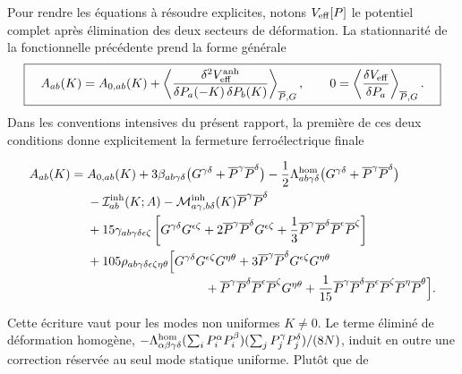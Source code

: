 Pour rendre les équations à résoudre explicites, notons
$V_{\rm eff}[P]$ le potentiel complet après élimination des deux secteurs de
déformation. La stationnarité de la fonctionnelle précédente prend la forme
générale
\begin{equation}
\boxed{\quad A_{ab}(K)=A_{0,ab}(K)
+\left\langle
\frac{\delta^2V_{\rm eff}^{\rm anh}}
{\delta P_a(-K)\,\delta P_b(K)}
\right\rangle_{\overline P,G},
\qquad
0=\left\langle
\frac{\delta V_{\rm eff}}{\delta P_a}
\right\rangle_{\overline P,G}.\quad}
\label{eq:core_ferro_general_scha_equations}
\end{equation}
Dans les conventions intensives du présent rapport, la première de ces deux
conditions donne explicitement la fermeture ferroélectrique finale
\begin{mdframed}[linecolor=red!60!black,nobreak=true]
\small
\begin{equation}
\begin{aligned}
A_{ab}(K)={}&A_{0,ab}(K)
+3\beta_{ab\gamma\delta}
\big(G^{\gamma\delta}+\overline P^\gamma\overline P^\delta\big)
-\frac12\Lambda^{\rm hom}_{ab\gamma\delta}
\big(G^{\gamma\delta}+\overline P^\gamma\overline P^\delta\big)\\
&-\mathcal I^{\rm inh}_{ab}(K;A)
-\mathcal M^{\rm inh}_{a\gamma,b\delta}(K)
\overline P^\gamma\overline P^\delta\\
&+15\gamma_{ab\gamma\delta\epsilon\zeta}
\left[G^{\gamma\delta}G^{\epsilon\zeta}
+2\overline P^\gamma\overline P^\delta G^{\epsilon\zeta}
+\frac13\overline P^\gamma\overline P^\delta
\overline P^\epsilon\overline P^\zeta\right]\\
&+105\rho_{ab\gamma\delta\epsilon\zeta\eta\theta}
\Big[G^{\gamma\delta}G^{\epsilon\zeta}G^{\eta\theta}
+3\overline P^\gamma\overline P^\delta
G^{\epsilon\zeta}G^{\eta\theta}\\[-2pt]
&\hspace{33mm}
+\overline P^\gamma\overline P^\delta
\overline P^\epsilon\overline P^\zeta G^{\eta\theta}
+\frac1{15}\overline P^\gamma\overline P^\delta
\overline P^\epsilon\overline P^\zeta
\overline P^\eta\overline P^\theta\Big].
\end{aligned}
\label{eq:core_ferro_full_closure}
\end{equation}
\end{mdframed}
Cette écriture vaut pour les modes non uniformes $K\neq0$. Le terme éliminé
de déformation homogène,
$-\Lambda^{\rm hom}_{\alpha\beta\gamma\delta}
(\sum_iP_i^\alpha P_i^\beta)(\sum_jP_j^\gamma P_j^\delta)/(8N)$, induit en
outre une correction réservée au seul mode statique uniforme. Plutôt que de
